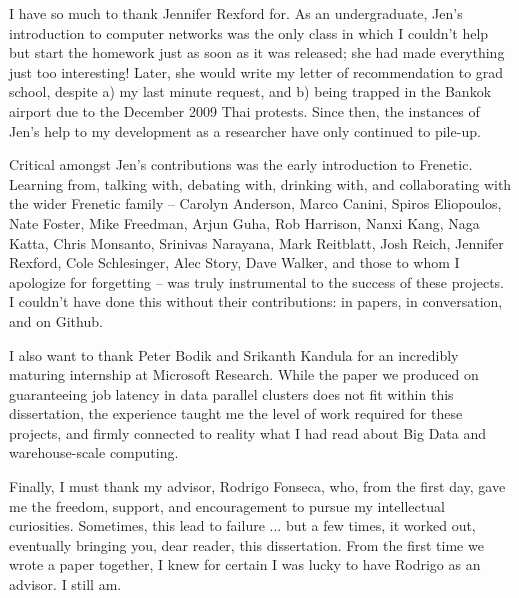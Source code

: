 I have so much to thank Jennifer Rexford for. As an undergraduate, Jen's
introduction to computer networks was the only class in which I couldn't help
but start the homework just as soon as it was released; she had made everything
just too interesting! Later, she would write my letter of recommendation to
grad school, despite a) my last minute request, and b) being trapped in the
Bankok airport due to the December 2009 Thai protests. Since then, the instances 
of Jen's help to my development as a researcher have only continued to pile-up.

Critical amongst Jen's contributions was the early introduction to Frenetic.
Learning from, talking with, debating with, drinking with, and collaborating
with the wider Frenetic family --
Carolyn Anderson, Marco Canini, Spiros Eliopoulos, Nate Foster, Mike Freedman,
Arjun Guha, Rob Harrison, Nanxi Kang, Naga Katta, Chris Monsanto, Srinivas Narayana,
Mark Reitblatt, Josh Reich, Jennifer Rexford, Cole Schlesinger, Alec Story,
Dave Walker, and those to whom I apologize for forgetting
-- was truly instrumental to the success of these projects.
I couldn't have done this without their contributions: in papers, in conversation,
and on Github.

I also want to thank Peter Bodik and Srikanth Kandula for an incredibly maturing
internship at Microsoft Research. While the paper we produced on guaranteeing job
latency in data parallel clusters does not fit
within this dissertation, the experience taught me the level of work required for
these projects, and firmly connected to reality what I had read about Big Data
and warehouse-scale computing.

Finally, I must thank my advisor, Rodrigo Fonseca, who, from the first day,
gave me the freedom, support, and encouragement to pursue my intellectual
curiosities. Sometimes, this lead to failure ... but a few times, it worked out,
eventually bringing you, dear reader, this dissertation. From the first time
we wrote a paper together, I knew for certain I was lucky to have Rodrigo
as an advisor. I still am.
